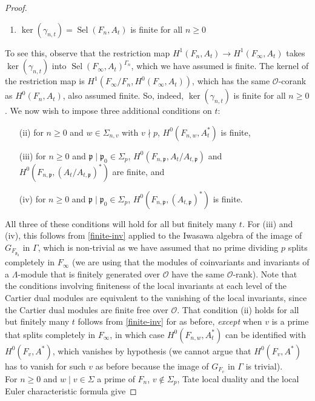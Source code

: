 \documentclass[12 pt]{amsart}
\theoremstyle{plain}
\theoremstyle{definition}
\numberwithin{equation}{section}
\numberwithin{table}{section}
\begin{document}
\begin{proof}
\begin{enumerate}
\item $\ker(\gamma_{n,t})=\operatorname{Sel}(F_n,A_t)$ is finite for all $n\geq 0$
\end{enumerate}
To see this, observe that the restriction map $H^1(F_n,A_t)\rightarrow H^1(F_\infty,A_t)$ takes $\ker(\gamma_{n,t})$ into $\operatorname{Sel}(F_\infty,A_t)^{\Gamma_n}$, which we have assumed is finite. The kernel of the restriction map is $H^1(F_\infty/F_n,H^0(F_\infty,A_t))$, which has the same $\mathscr{O}$-corank as $H^0(F_n,A_t)$, also assumed finite. So, indeed, $\ker(\gamma_{n,t})$ is finite for all $n\geq 0$. We now wish to impose three additional conditions on $t$:
\begin{enumerate}
\item[(ii)] for $n\geq 0$ and $w\in\Sigma_{n,v}$ with $v\nmid p$, $H^0(F_{n,w},A_t^*)$ is finite,
\item[(iii)] for $n\geq 0$ and $\mathfrak{p}\mid \mathfrak{p}_0\in\Sigma_p$, $H^0(F_{n,\mathfrak{p}},A_t/A_{t,\mathfrak{p}})$ and $H^0(F_{n,\mathfrak{p}},(A_t/A_{t,\mathfrak{p}})^*)$ are finite, and
\item[(iv)] for $n\geq 0$ and $\mathfrak{p}\mid \mathfrak{p}_0\in\Sigma_p$, $H^0(F_{n,\mathfrak{p}},(A_{t,\mathfrak{p}})^*)$ is finite.
\end{enumerate}
All three of these conditions will hold for all but finitely many $t$. For (iii) and (iv), this follows from \cref{finite-inv} applied to the Iwasawa algebra of the image of $G_{F_{\mathfrak{p}_0}}$ in $\Gamma$, which is non-trivial as we have assumed that no prime dividing $p$ splits completely in $F_\infty$ (we are using that the modules of coinvariants and invariants of a $\Lambda$-module that is finitely generated over $\mathscr{O}$ have the same $\mathscr{O}$-rank). Note that the conditions involving finiteness of the local invariants at each level of the Cartier dual modules are equivalent to the vanishing of the local invariants, since the Cartier dual modules are finite free over $\mathscr{O}$. That condition (ii) holds for all but finitely many $t$ follows from \cref{finite-inv} for as before, \emph{except} when $v$ is a prime that splits completely in $F_\infty$, in which case $H^0(F_{n,w},A_t^*)$ can be identified with $H^0(F_v,A^*)$, which vanishes by hypothesis (we cannot argue that $H^0(F_v,A^*)$ has to vanish for such $v$ as before because the image of $G_{F_v}$ in $\Gamma$ is trivial).\\%
\indent For $n\geq 0$ and $w\mid v\in\Sigma$ a prime of $F_n$, $v\notin\Sigma_p$, Tate local duality and the local Euler characteristic formula give

\end{proof}
\end{document}
